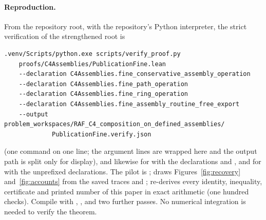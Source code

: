 \documentclass[11pt,a4paper]{article}
\theoremstyle{plain}
\theoremstyle{definition}
\theoremstyle{remark}
\begin{document}
\paragraph{Reproduction.}
From the repository root, with the repository's Python interpreter, the strict verification of the strengthened root is
{\small\begin{verbatim}
.venv/Scripts/python.exe scripts/verify_proof.py
    proofs/C4Assemblies/PublicationFine.lean
    --declaration C4Assemblies.fine_conservative_assembly_operation
    --declaration C4Assemblies.fine_path_operation
    --declaration C4Assemblies.fine_ring_operation
    --declaration C4Assemblies.fine_assembly_routine_free_export
    --output problem_workspaces/RAF_C4_composition_on_defined_assemblies/
             PublicationFine.verify.json
\end{verbatim}}
(one command on one line; the argument lines are wrapped here and the output path is split only for display), and likewise for  with the  declarations and , and for  with the unprefixed declarations. The pilot is ;  draws Figures~\ref{fig:recovery} and~\ref{fig:accounts} from the saved traces  and ;  re-derives every identity, inequality, certificate and printed number of this paper in exact arithmetic (one hundred checks). Compile with , , and two further  passes. No numerical integration is needed to verify the theorem.

\small


\end{document}
